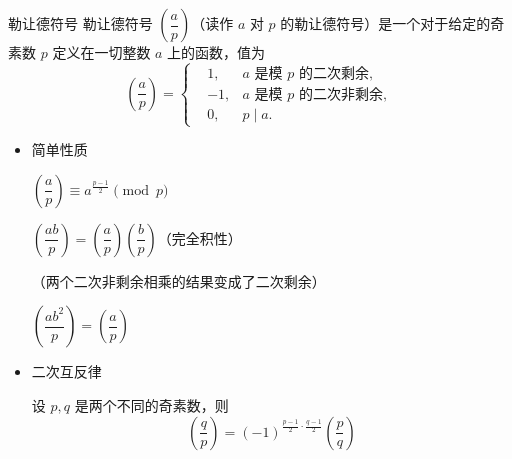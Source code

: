 \documentclass [hyperref={bookmarksdepth=4}, aspectratio=169] {beamer}
\theoremstyle {fy}
\begin{document}
\begin{frame}{勒让德符号}
勒让德符号 $\left(\dfrac{a}{p}\right)$（读作 $a$ 对 $p$ 的勒让德符号）是一个对于给定的奇素数 $p$ 定义在一切整数 $a$ 上的函数，值为
$$
\left(\frac{a}{p}\right)=
\left\{
\begin{aligned}
&1, & a \text{ 是模 } p \text{ 的二次剩余},\\
&-1, & a \text{ 是模 } p \text{ 的二次非剩余},\\
&0, & p\mid a.
\end{aligned}
\right.
$$

\begin{itemize}
    \item 简单性质

  $\left(\dfrac{a}{p}\right)\equiv a^{\frac{p-1}{2}}\pmod p$

  $\left(\dfrac{ab}{p}\right)=\left(\dfrac{a}{p}\right)\left(\dfrac{b}{p} \right)$（完全积性）

  （两个二次非剩余相乘的结果变成了二次剩余）

  $\left(\dfrac{ab^2}{p} \right)=\left(\dfrac{a}{p} \right)$

    \item 二次互反律

  设 $p,q$ 是两个不同的奇素数，则
  $$
  \left(\frac{q}{p} \right)=(-1)^{\frac{p-1}{2}\cdot\frac{q-1}{2}}\left(\frac{p}{q} \right)
  $$
\end{itemize}
\end{frame}
\end{document}
